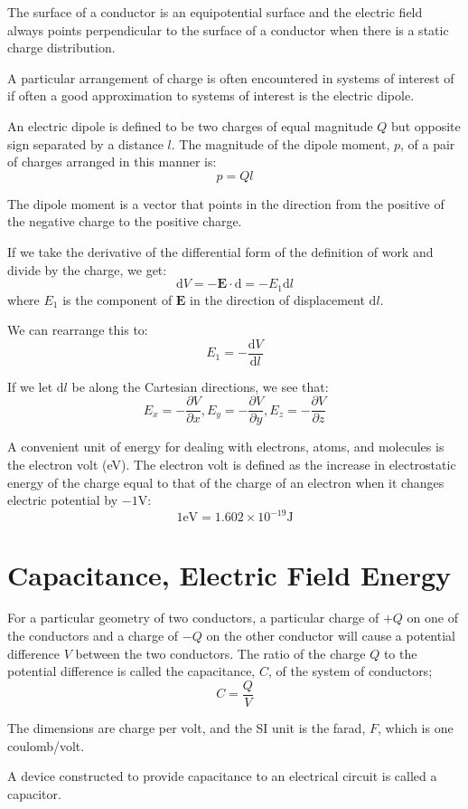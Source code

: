 \documentclass[../introphysics.tex]{subfiles}
\begin{document}
The surface of a conductor is an equipotential surface and the electric field
always points perpendicular to the surface of a conductor when there is a static charge distribution.

A particular arrangement of charge is often encountered in systems of interest of if 
often a good approximation to systems of interest is the electric dipole.

An electric dipole is defined to be two charges of equal magnitude $Q$ but 
opposite sign separated by a distance $l$. The magnitude of the dipole moment, $p$, of a pair 
of charges arranged in this manner is:
\[p=Ql\]

The dipole moment is a vector that points in the direction from the positive
of the negative charge to the positive charge.

If we take the derivative of the differential form of the definition of work and divide by the charge, we get:
\[\mathrm{d}V=-\textbf{E}\cdot\mathrm{d}=-E_1\mathrm{d}l\]
where $E_1$ is the component of $\textbf{E}$ in the direction of displacement $\mathrm{d}l$.

We can rearrange this to:
\[E_1=-\frac{\mathrm{d}V}{\mathrm{d}l}\]

If we let $\mathrm{d}l$ be along the Cartesian directions, we see that:
\[ E_x = -\frac{\partial V}{\partial x}, E_y=-\frac{\partial V}{\partial y}, E_z=-\frac{\partial V}{\partial z}\]

A convenient unit of energy for dealing with electrons, atoms, and molecules is the electron volt (eV).
The electron volt is defined as the increase in electrostatic energy of the charge
equal to that of the charge of an electron when it changes electric potential by $-1$V:
\[ 1\text{eV}=1.602\times10^{-19}\text{J}\]

\section{Capacitance, Electric Field Energy}
For a particular geometry of two conductors, a particular charge of $+Q$ on one of the conductors and a charge of $-Q$ on the 
other conductor will cause a potential difference $V$ between the two conductors. The ratio of the charge $Q$ to the 
potential difference is called the capacitance, $C$, of the system of conductors;
\[C=\frac{Q}{V}\]

The dimensions are charge per volt, and the SI unit is the farad, $F$, which is one coulomb/volt.

A device constructed to provide capacitance to an electrical circuit is called a capacitor.
\end{document}
